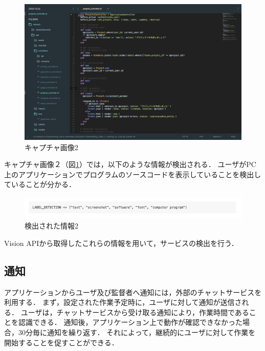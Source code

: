 \clearpage

\begin{figure}[h]
  \begin{center}
  \includegraphics[width=14.0cm]{graphics/screenshot02.png}
  \caption{キャプチャ画像2}
  \label{fig:screenshot02}
  \end{center}
\end{figure}

キャプチャ画像２（図\ref{fig:screenshot02}）では，以下のような情報が検出される．
ユーザがPC上のアプリケーションでプログラムのソースコードを表示していることを検出していることが分かる．

\begin{figure}[h]
  \begin{center}
  \includegraphics[width=14.0cm]{graphics/response02.png}
  \caption{検出された情報2}
  \label{fig:response02}
  \end{center}
\end{figure}

Vision APIから取得したこれらの情報を用いて，サービスの検出を行う．

\subsection{通知}
アプリケーションからユーザ及び監督者へ通知には，外部のチャットサービスを利用する．
まず，設定された作業予定時に，ユーザに対して通知が送信される．
ユーザは，チャットサービスから受け取る通知により，作業時間であることを認識できる．
通知後，アプリケーション上で動作が確認できなかった場合，30分毎に通知を繰り返す．
それによって，継続的にユーザに対して作業を開始することを促すことができる．

